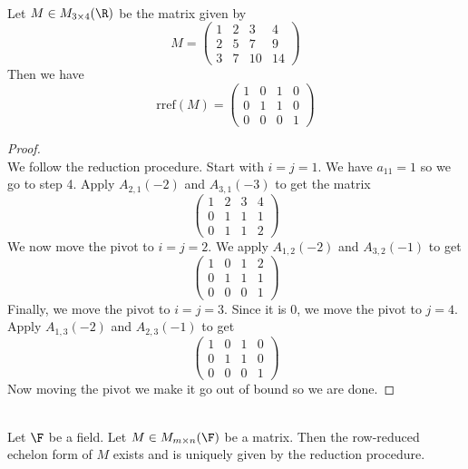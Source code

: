 \documentclass[a4paper]{article}
\begin{document}
\begin{eg}{}{}\\
Let $M\in M_{3\times 4}(\R)$ be the matrix given by $$M=\begin{pmatrix}
1 & 2 & 3 & 4\\
2 & 5 & 7 & 9\\
3 & 7 & 10 & 14
\end{pmatrix}$$
Then we have $$\text{rref}(M)=\begin{pmatrix}
1 & 0 & 1 & 0\\
0 & 1 & 1 & 0\\
0 & 0 & 0 & 1
\end{pmatrix}$$
\begin{proof}\\
We follow the reduction procedure. Start with $i=j=1$. We have $a_{11}=1$ so we go to step 4. Apply $A_{2,1}(-2)$ and $A_{3,1}(-3)$ to get the matrix $$\begin{pmatrix}
1 & 2 & 3 & 4\\
0 & 1 & 1 & 1\\
0 & 1 & 1 & 2
\end{pmatrix}$$ We now move the pivot to $i=j=2$. We apply $A_{1,2}(-2)$ and $A_{3,2}(-1)$ to get $$\begin{pmatrix}
1 & 0 & 1 & 2\\
0 & 1 & 1 & 1\\
0 & 0 & 0 & 1
\end{pmatrix}$$ Finally, we move the pivot to $i=j=3$. Since it is $0$, we move the pivot to $j=4$. Apply $A_{1,3}(-2)$ and $A_{2,3}(-1)$ to get $$\begin{pmatrix}
1 & 0 & 1 & 0\\
0 & 1 & 1 & 0\\
0 & 0 & 0 & 1
\end{pmatrix}$$ Now moving the pivot we make it go out of bound so we are done. 
\end{proof}
\end{eg}

\begin{prp}{}{}\\
Let $\F$ be a field. Let $M\in M_{m\times n}(\F)$ be a matrix. Then the row-reduced echelon form of $M$ exists and is uniquely given by the reduction procedure. 
\end{prp}
\end{document}

